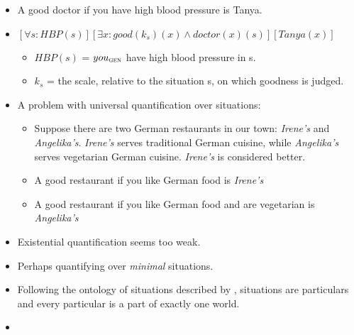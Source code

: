 \documentclass[letterpaper,12pt]{article}
\begin{document}
\begin{itemize}
  \item A good doctor if you have high blood pressure is Tanya.
  \item $[\forall s: HBP(s)][\exists x: good(k_s)(x) \wedge doctor(x)(s)][Tanya(x)]$
    \begin{itemize}
      \item $HBP(s)$ = $you_{\textsc{gen}}$ have high blood pressure in s.
      \item $k_s$ = the scale, relative to the situation s, on which goodness is judged. \parencite{kennedy2007vagueness}
    \end{itemize}
  \item A problem with universal quantification over situations:
    \begin{itemize}
      \item Suppose there are two German restaurants in our town: \textit{Irene's} and \textit{Angelika's}.
	\textit{Irene's} serves traditional German cuisine, while \textit{Angelika's} serves vegetarian German cuisine.
	\textit{Irene's} is considered better.
      \item A good restaurant if you like German food is \textit{Irene's}
      \item A good restaurant if you like German food and are vegetarian is \textit{Angelika's}
    \end{itemize}
  \item Existential quantification seems too weak.
  \item Perhaps quantifying over \textit{minimal} situations. \parencite{elbourne2005situations}
  \item Following the ontology of situations described by \textcite{kratzer1989investigation}, situations are particulars and every particular is a part of exactly one world.
  \item 
\end{itemize}
\printbibliography
\end{document}

